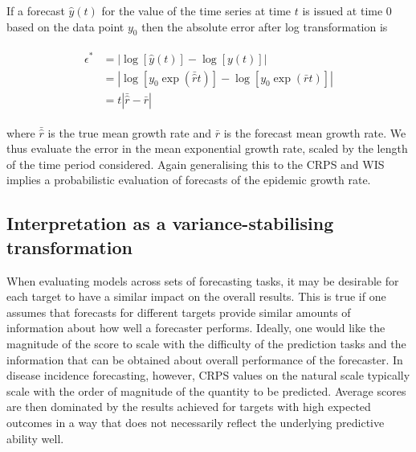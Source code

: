 \documentclass{article}
\begin{document}
If a forecast $\hat{y}(t)$ for the value of the time series at time $t$ is issued at time 0 based on the data point $y_0$ then the absolute error after log transformation is
%
\begin{linenomath*}
\begin{align}
\begin{split}
\epsilon^* &= \left| \log \left[ \hat{y}( t ) \right] - \log \left[ y ( t ) \right] \right|\\
           &= \left| \log \left[ y_0 \exp (\bar{\hat{r}} t ) \right] - \log \left[ y_0 \exp (\bar{r}t) \right] \right|\\
           &= t \left| \bar{\hat{r}} - \bar{r} \right|
\end{split}
\end{align}
\end{linenomath*}
%
where $\bar{\hat{r}}$ is the true mean growth rate and $\bar{r}$ is the forecast mean growth rate. We thus evaluate the error in the mean exponential growth rate, scaled by the length of the time period considered. Again generalising this to the CRPS and WIS implies a probabilistic evaluation of forecasts of the epidemic growth rate.

\subsection{Interpretation as a variance-stabilising transformation}
\label{sec:methods:vst}

When evaluating models across sets of forecasting tasks, it may be desirable for each target to have a similar impact on the overall results. This is true if one assumes that forecasts for different targets provide similar amounts of information about how well a forecaster performs. Ideally, one would like the magnitude of the score to scale with the difficulty of the prediction tasks and the information that can be obtained about overall performance of the forecaster. In disease incidence forecasting, however, CRPS values on the natural scale typically scale with the order of magnitude of the quantity to be predicted. Average scores are then dominated by the results achieved for targets with high expected outcomes in a way that does not necessarily reflect the underlying predictive ability well. 
\end{document}
